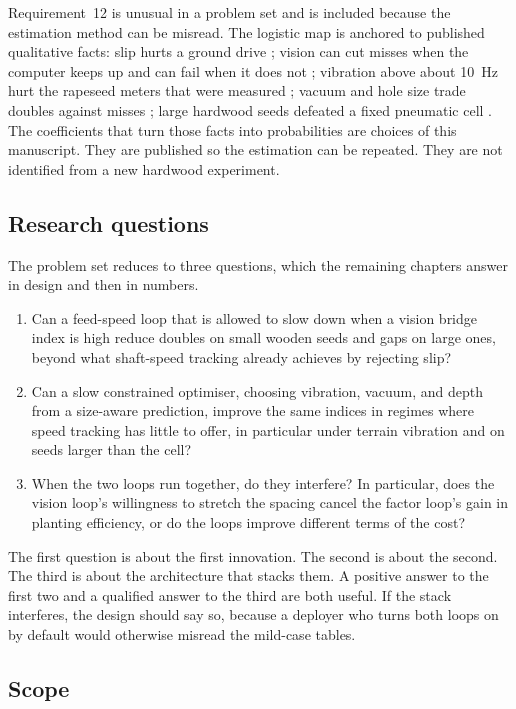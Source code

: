 Requirement~12 is unusual in a problem set and is included because the estimation method can be misread. The logistic map is anchored to published qualitative facts: slip hurts a ground drive \cite{zhao2024,aces2024}; vision can cut misses when the computer keeps up and can fail when it does not \cite{borja2021}; vibration above about 10~Hz hurt the rapeseed meters that were measured \cite{zhang2024vib,wu2022}; vacuum and hole size trade doubles against misses \cite{yazgi2007,onal2012}; large hardwood seeds defeated a fixed pneumatic cell \cite{wells1990}. The coefficients that turn those facts into probabilities are choices of this manuscript. They are published so the estimation can be repeated. They are not identified from a new hardwood experiment.

\subsection{Research questions}

The problem set reduces to three questions, which the remaining chapters answer in design and then in numbers.

\begin{enumerate}
\item Can a feed-speed loop that is allowed to slow down when a vision bridge index is high reduce doubles on small wooden seeds and gaps on large ones, beyond what shaft-speed tracking already achieves by rejecting slip?
\item Can a slow constrained optimiser, choosing vibration, vacuum, and depth from a size-aware prediction, improve the same indices in regimes where speed tracking has little to offer, in particular under terrain vibration and on seeds larger than the cell?
\item When the two loops run together, do they interfere? In particular, does the vision loop's willingness to stretch the spacing cancel the factor loop's gain in planting efficiency, or do the loops improve different terms of the cost?
\end{enumerate}

The first question is about the first innovation. The second is about the second. The third is about the architecture that stacks them. A positive answer to the first two and a qualified answer to the third are both useful. If the stack interferes, the design should say so, because a deployer who turns both loops on by default would otherwise misread the mild-case tables.

\subsection{Scope}

